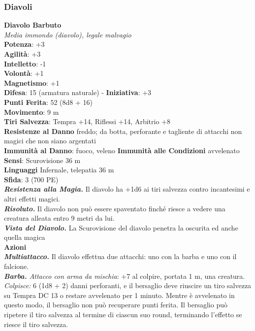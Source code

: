 \begin{multicols}{2}
\subsubsection{Diavoli}

\medskip\textbf{Diavolo Barbuto}\\
\emph{Media immondo (diavolo), legale malvagio}\\
\textbf{Potenza}: +3\\
\textbf{Agilità}: +3\\
\textbf{Intelletto}: -1\\
\textbf{Volontà}: +1\\
\textbf{Magnetismo}: +1\\
\textbf{Difesa}: 15 (armatura naturale) - \textbf{Iniziativa}: +3\\
\textbf{Punti Ferita}: 52 (8d8 + 16)\\
\textbf{Movimento}: 9 m\\
\textbf{Tiri Salvezza}: Tempra +14, Riflessi +14, Arbitrio +8\\
\textbf{Resistenze al Danno} freddo; da botta, perforante e tagliente di attacchi non magici che non siano argentati\\
\textbf{Immunità al Danno}: fuoco, veleno \textbf{Immunità alle Condizioni} avvelenato\\
\textbf{Sensi}: Scurovisione 36 m\\
\textbf{Linguaggi} Infernale, telepatia 36 m \\
\textbf{Sfida}: 3 (700 PE)\smallskip\\
\emph{\textbf{Resistenza alla Magia.}} Il diavolo ha +1d6 ai tiri salvezza contro incantesimi e altri effetti magici.\\
\emph{\textbf{Risoluto.}} Il diavolo non può essere spaventato finché riesce a vedere una creatura alleata entro 9 metri da lui.\\
\emph{\textbf{Vista del Diavolo.}} La Scurovisione del diavolo penetra la oscurita ed anche quella magica\\
\smallskip\textbf{Azioni}\\
\emph{\textbf{Multiattacco.}} Il diavolo effettua due attacchi: uno con la barba e uno con il falcione.\\
\emph{\textbf{Barba.} Attacco con arma da mischia}: +7 al colpire, portata 1 m, una creatura.\\
\emph{Colpisce:} 6 (1d8 + 2) danni perforanti, e il bersaglio deve riuscire un tiro salvezza su Tempra DC  13 o restare avvelenato per 1 minuto. Mentre è avvelenato in questo modo, il bersaglio non può recuperare punti ferita. Il bersaglio può ripetere il tiro salvezza al termine di ciascun suo round, terminando l'effetto se riesce il tiro salvezza.\\

\end{multicols}
